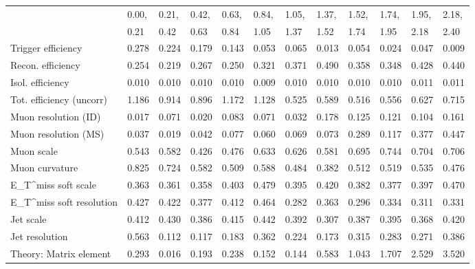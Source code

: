 \begin{tabular}{l|p{0.6cm}p{0.6cm}p{0.6cm}p{0.6cm}p{0.6cm}p{0.6cm}p{0.6cm}p{0.6cm}p{0.6cm}p{0.6cm}p{0.6cm}}
\hline
   & 0.00, & 0.21, & 0.42, & 0.63, & 0.84, & 1.05, & 1.37, & 1.52, & 1.74, & 1.95, & 2.18,  \\ 
   & 0.21 & 0.42 & 0.63 & 0.84 & 1.05 & 1.37 & 1.52 & 1.74 & 1.95 & 2.18 & 2.40  \\ 
\hline
Trigger efficiency                       & 0.278 & 0.224 & 0.179 & 0.143 & 0.053 & 0.065 & 0.013 & 0.054 & 0.024 & 0.047 & 0.009 \\
Recon. efficiency                        & 0.254 & 0.219 & 0.267 & 0.250 & 0.321 & 0.371 & 0.490 & 0.358 & 0.348 & 0.428 & 0.440 \\
Isol. efficiency                         & 0.010 & 0.010 & 0.010 & 0.010 & 0.009 & 0.010 & 0.010 & 0.010 & 0.010 & 0.011 & 0.011 \\
Tot. efficiency (uncorr)                 & 1.186 & 0.914 & 0.896 & 1.172 & 1.128 & 0.525 & 0.589 & 0.516 & 0.556 & 0.627 & 0.715 \\
Muon resolution (ID)                     & 0.017 & 0.071 & 0.020 & 0.083 & 0.071 & 0.032 & 0.178 & 0.125 & 0.121 & 0.104 & 0.161 \\
Muon resolution (MS)                     & 0.037 & 0.019 & 0.042 & 0.077 & 0.060 & 0.069 & 0.073 & 0.289 & 0.117 & 0.377 & 0.447 \\
Muon scale                               & 0.543 & 0.582 & 0.426 & 0.476 & 0.633 & 0.626 & 0.581 & 0.695 & 0.744 & 0.704 & 0.706 \\
Muon curvature                           & 0.825 & 0.724 & 0.582 & 0.509 & 0.588 & 0.484 & 0.382 & 0.512 & 0.519 & 0.535 & 0.476 \\
E_{T}^{miss} soft scale                  & 0.363 & 0.361 & 0.358 & 0.403 & 0.479 & 0.395 & 0.420 & 0.382 & 0.377 & 0.397 & 0.470 \\
E_{T}^{miss} soft resolution             & 0.427 & 0.422 & 0.377 & 0.412 & 0.464 & 0.282 & 0.363 & 0.296 & 0.334 & 0.311 & 0.331 \\
Jet scale                                & 0.412 & 0.430 & 0.386 & 0.415 & 0.442 & 0.392 & 0.307 & 0.387 & 0.395 & 0.368 & 0.420 \\
Jet resolution                           & 0.563 & 0.112 & 0.117 & 0.183 & 0.362 & 0.224 & 0.173 & 0.315 & 0.283 & 0.271 & 0.386 \\
Theory: Matrix element                   & 0.293 & 0.016 & 0.193 & 0.238 & 0.152 & 0.144 & 0.583 & 1.043 & 1.707 & 2.529 & 3.520 \\

\end{tabular}
